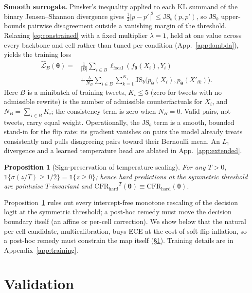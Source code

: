 \documentclass[11pt]{article}
\newtheorem{proposition}{Proposition}
\newcommand{\CFRh}{\ensuremath{\mathrm{CFR}_{\mathrm{hard}}}\xspace}
\newcommand{\JS}{\ensuremath{\mathrm{JS}_b}\xspace}
\newcommand{\Indi}{\mathds{1}}
\newcommand{\Loss}{\mathcal{L}}
\newcommand{\bth}{{\boldsymbol{\theta}}}
\begin{document}
\textbf{Smooth surrogate.} Pinsker's inequality applied to each KL summand of the binary Jensen--Shannon divergence gives $\tfrac{1}{2}|p-p'|^2 \le \JS(p,p')$, so \JS{} upper-bounds pairwise disagreement outside a vanishing margin of the threshold. Relaxing \eqref{eq:constrained} with a fixed multiplier $\lambda{=}1$, held at one value across every backbone and cell rather than tuned per condition (App.~\ref{app:lambda}), yields the training loss
\begin{equation*}
\begin{aligned}
\widehat{\Loss}_B(\bth) = {}& \frac{1}{|B|}\sum_{i\in B}\ell_{\mathrm{focal}}(f_\bth(X_i),Y_i) \\
&+ \frac{\lambda}{N_B}\sum_{i\in B}\sum_{k=1}^{K_i}\JS\bigl(p_\bth(X_i),p_\bth(X'_{ik})\bigr).
\end{aligned}
\end{equation*}
Here $B$ is a minibatch of training tweets, $K_i \le 5$ (zero for tweets with no admissible rewrite) is the number of admissible counterfactuals for $X_i$, and $N_B = \sum_{i\in B}K_i$; the consistency term is zero when $N_B{=}0$. Valid pairs, not tweets, carry equal weight. Operationally, the \JS{} term is a smooth, bounded stand-in for the flip rate: its gradient vanishes on pairs the model already treats consistently and pulls disagreeing pairs toward their Bernoulli mean. An $L_1$ divergence and a learned temperature head are ablated in App.~\ref{app:extended}.

\begin{proposition}[Sign-preservation of temperature scaling]\label{prop:ts}
For any $T>0$, $\Indi\{\sigma(z/T)\ge 1/2\}=\Indi\{z\ge 0\}$; hence hard predictions at the symmetric threshold are pointwise $T$-invariant and $\CFRh^T(\bth)\equiv\CFRh(\bth)$.
\end{proposition}

\noindent Proposition~\ref{prop:ts} rules out every intercept-free monotone rescaling of the decision logit at the symmetric threshold; a post-hoc remedy must move the decision boundary itself (an affine or per-cell correction). We show below that the natural per-cell candidate, multicalibration, buys ECE at the cost of soft-flip inflation, so a post-hoc remedy must constrain the map itself (\S\ref{sec:validation}). Training details are in Appendix~\ref{app:training}.

\section{Validation}
\label{sec:validation}
\end{document}
